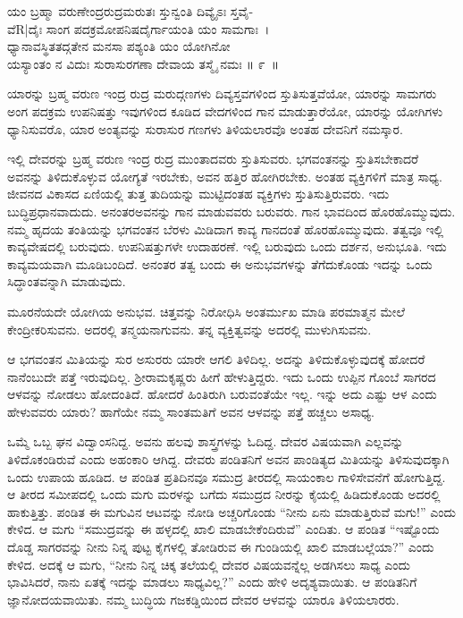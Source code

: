 \begin{shloka}
ಯಂ ಬ್ರಹ್ಮಾ ವರುಣೇಂದ್ರರುದ್ರಮರುತಃ ಸ್ತುನ್ವಂತಿ ದಿವ್ಯೈಽಃ ಸ್ತವೈ-\\ವೆR|ದೈಃ ಸಾಂಗ ಪದಕ್ರಮೋಪನಿಷದೈರ್ಗಾಯಂತಿ ಯಂ ಸಾಮಗಾಃ~।\\ಧ್ಯಾನಾವಸ್ಥಿತತದ್ಗತೇನ ಮನಸಾ ಪಶ್ಯಂತಿ ಯಂ ಯೋಗಿನೋ \\ಯಸ್ಯಾಂತಂ ನ ವಿದುಃ ಸುರಾಸುರಗಣಾ ದೇವಾಯ ತಸ್ಮೈ ನಮಃ \hfill॥ ೯~॥
\end{shloka}

\begin{artha}
ಯಾರನ್ನು ಬ್ರಹ್ಮ ವರುಣ ಇಂದ್ರ ರುದ್ರ ಮರುದ್ಗಣಗಳು ದಿವ್ಯಸ್ತವಗಳಿಂದ ಸ್ತುತಿಸುತ್ತವೆಯೋ, ಯಾರನ್ನು ಸಾಮಗರು ಅಂಗ ಪದಕ್ರಮ ಉಪನಿಷತ್ತು ಇವುಗಳಿಂದ ಕೂಡಿದ ವೇದಗಳಿಂದ ಗಾನ ಮಾಡುತ್ತಾರೆಯೋ, ಯಾರನ್ನು ಯೋಗಿಗಳು ಧ್ಯಾನಿಸುವರೊ, ಯಾರ ಅಂತ್ಯವನ್ನು ಸುರಾಸುರ ಗಣಗಳು ತಿಳಿಯಲಾರವೊ ಅಂತಹ ದೇವನಿಗೆ ನಮಸ್ಕಾರ.
\end{artha}

ಇಲ್ಲಿ ದೇವರನ್ನು ಬ್ರಹ್ಮ ವರುಣ ಇಂದ್ರ ರುದ್ರ ಮುಂತಾದವರು ಸ್ತುತಿಸುವರು. ಭಗವಂತನನ್ನು ಸ್ತುತಿಸಬೇಕಾದರೆ ಅವನನ್ನು ತಿಳಿದುಕೊಳ್ಳುವ ಯೋಗ್ಯತೆ ಇರಬೇಕು, ಅವನ ಹತ್ತಿರ ಹೋಗಿರಬೇಕು. ಅಂತಹ ವ್ಯಕ್ತಿಗಳಿಗೆ ಮಾತ್ರ ಸಾಧ್ಯ. ಜೀವನದ ವಿಕಾಸದ ಏಣಿಯಲ್ಲಿ ತುತ್ತ ತುದಿಯನ್ನು ಮುಟ್ಟಿದಂತಹ ವ್ಯಕ್ತಿಗಳು ಸ್ತುತಿಸುತ್ತಿರುವರು. ಇದು ಬುದ್ಧಿಪ್ರಧಾನವಾದುದು. ಅನಂತರ\break ಅವನನ್ನು ಗಾನ ಮಾಡುವವರು ಬರುವರು. ಗಾನ ಭಾವದಿಂದ ಹೊರಹೊಮ್ಮುವುದು. ನಮ್ಮ ಹೃದಯ ತಂತಿಯನ್ನು ಭಗವಂತನ ಬೆರಳು ಮಿಡಿದಾಗ ಕಾವ್ಯ ಗಾನದಂತೆ ಹೊರಹೊಮ್ಮುವುದು. ತತ್ವವೂ ಇಲ್ಲಿ ಕಾವ್ಯವೇಷದಲ್ಲಿ ಬರುವುದು. ಉಪನಿಷತ್ತುಗಳೇ ಉದಾಹರಣೆ. ಇಲ್ಲಿ ಬರುವುದು ಒಂದು ದರ್ಶನ, ಅನುಭೂತಿ. ಇದು ಕಾವ್ಯಮಯವಾಗಿ ಮೂಡಿಬಂದಿದೆ. ಅನಂತರ ತತ್ವ ಬಂದು ಈ ಅನುಭವಗಳನ್ನು ತೆಗೆದುಕೊಂಡು ಇದನ್ನು ಒಂದು ಸಿದ್ಧಾಂತವನ್ನಾಗಿ ಮಾಡುವುದು.

ಮೂರನೆಯದೇ ಯೋಗಿಯ ಅನುಭವ. ಚಿತ್ತವನ್ನು ನಿರೋಧಿಸಿ ಅಂತರ್ಮುಖ ಮಾಡಿ ಪರಮಾತ್ಮನ ಮೇಲೆ ಕೇಂದ್ರೀಕರಿಸುವನು. ಅದರಲ್ಲಿ ತನ್ಮಯನಾಗುವನು. ತನ್ನ ವ್ಯಕ್ತಿತ್ವವನ್ನು ಅದರಲ್ಲಿ ಮುಳುಗಿಸುವನು.

ಆ ಭಗವಂತನ ಮಿತಿಯನ್ನು ಸುರ ಅಸುರರು ಯಾರೇ ಆಗಲಿ ತಿಳಿದಿಲ್ಲ. ಅದನ್ನು ತಿಳಿದುಕೊಳ್ಳುವುದಕ್ಕೆ ಹೋದರೆ ನಾನೆಂಬುದೇ ಪತ್ತೆ ಇರುವುದಿಲ್ಲ. ಶ‍್ರೀರಾಮಕೃಷ್ಣರು ಹೀಗೆ ಹೇಳುತ್ತಿದ್ದರು. ಇದು ಒಂದು ಉಪ್ಪಿನ ಗೊಂಬೆ ಸಾಗರದ ಆಳವನ್ನು ನೋಡಲು ಹೋದಂತಿದೆ. ಹೋದರೆ ಹಿಂತಿರುಗಿ ಬರುವಂತೆಯೇ ಇಲ್ಲ. ಇನ್ನು ಅದು ಎಷ್ಟು ಆಳ ಎಂದು ಹೇಳುವವರು ಯಾರು? ಹಾಗೆಯೇ ನಮ್ಮ ಸಾಂತಮತಿಗೆ ಅವನ ಆಳವನ್ನು ಪತ್ತೆ ಹಚ್ಚಲು ಅಸಾಧ್ಯ.

ಒಮ್ಮೆ ಒಬ್ಬ ಘನ ವಿದ್ವಾಂಸನಿದ್ದ. ಅವನು ಹಲವು ಶಾಸ್ತ್ರಗಳನ್ನು ಓದಿದ್ದ. ದೇವರ ವಿಷಯವಾಗಿ ಎಲ್ಲವನ್ನು ತಿಳಿದೊಕಂಡಿರುವೆ ಎಂದು ಅಹಂಕಾರಿ ಆಗಿದ್ದ. ದೇವರು ಪಂಡಿತನಿಗೆ ಅವನ ಪಾಂಡಿತ್ಯದ ಮಿತಿಯನ್ನು ತಿಳಿಸುವುದಕ್ಕಾಗಿ ಒಂದು ಉಪಾಯ ಹೂಡಿದ. ಆ ಪಂಡಿತ ಪ್ರತಿದಿನವೂ ಸಮುದ್ರ ತೀರದಲ್ಲಿ ಸಾಯಂಕಾಲ ಗಾಳಿಸೇವನೆಗೆ ಹೋಗುತ್ತಿದ್ದ. ಆ ತೀರದ ಸಮೀಪದಲ್ಲಿ ಒಂದು ಮಗು ಮರಳನ್ನು ಬಗೆದು ಸಮುದ್ರದ ನೀರನ್ನು ಕೈಯಲ್ಲಿ ಹಿಡಿದುಕೊಂಡು ಅದರಲ್ಲಿ ಹಾಕುತ್ತಿತ್ತು. ಪಂಡಿತ ಈ ಮಗುವಿನ ಆಟವನ್ನು ನೋಡಿ ಅಚ್ಚರಿಗೊಂಡು “ನೀನು ಏನು ಮಾಡುತ್ತಿರುವೆ ಮಗು!” ಎಂದು ಕೇಳಿದ. ಆ ಮಗು “ಸಮುದ್ರವನ್ನು ಈ ಹಳ್ಳದಲ್ಲಿ ಖಾಲಿ ಮಾಡಬೇಕೆಂದಿರುವೆ” ಎಂದಿತು. ಆ ಪಂಡಿತ “ಇಷ್ಟೊಂದು ದೊಡ್ಡ ಸಾಗರವನ್ನು ನೀನು ನಿನ್ನ ಪುಟ್ಟ ಕೈಗಳಲ್ಲಿ ತೋಡಿರುವ ಈ ಗುಂಡಿಯಲ್ಲಿ ಖಾಲಿ ಮಾಡಬಲ್ಲೆಯಾ?” ಎಂದು ಕೇಳಿದ. ಅದಕ್ಕೆ ಆ ಮಗು, “ನೀನು ನಿನ್ನ ಚಿಕ್ಕ ತಲೆಯಲ್ಲಿ ದೇವರ ವಿಷಯವನ್ನೆಲ್ಲ ಅಡಗಿಸಲು ಸಾಧ್ಯ ಎಂದು ಭಾವಿಸಿದರೆ, ನಾನು ಏತಕ್ಕೆ ಇದನ್ನು ಮಾಡಲು ಸಾಧ್ಯವಿಲ್ಲ?” ಎಂದು ಹೇಳಿ ಅದೃಶ್ಯವಾಯಿತು. ಆ ಪಂಡಿತನಿಗೆ ಜ್ಞಾನೋದಯ\-ವಾಯಿತು. ನಮ್ಮ ಬುದ್ಧಿಯ ಗಜಕಡ್ಡಿಯಿಂದ ದೇವರ ಆಳವನ್ನು ಯಾರೂ ತಿಳಿಯಲಾರರು.

